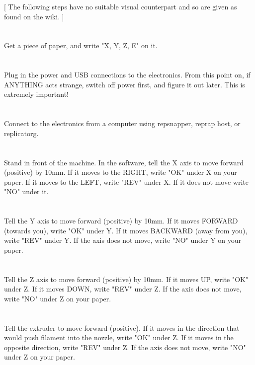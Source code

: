 \documentclass[twoside,openany,a4paper,titlepage]{memoir}
\begin{document}
	[ The following steps have no suitable visual counterpart and so are given as found on the wiki. ]
	
	\section{}
	Get a piece of paper, and write "X, Y, Z, E" on it.
	
	\section{}
	Plug in the power and USB connections to the electronics. From this point on, if ANYTHING acts
	strange, switch off power first, and figure it out later. This is extremely important!
	
	\section{}
	Connect to the electronics from a computer using repsnapper, reprap host, or replicatorg.
	
	\section{}
	Stand in front of the machine. In the software, tell the X axis to move forward (positive) by 10mm. If it
	moves to the RIGHT, write "OK" under X on your paper. If it moves to the LEFT, write "REV" under X. If
	it does not move write "NO" under it.
	
	\section{}
	Tell the Y axis to move forward (positive) by 10mm. If it moves FORWARD (towards you), write "OK"
	under Y. If it moves BACKWARD (away from you), write "REV" under Y. If the axis does not move,
	write "NO" under Y on your paper.
	
	\section{}
	Tell the Z axis to move forward (positive) by 10mm. If it moves UP, write "OK" under Z. If it moves
	DOWN, write "REV" under Z. If the axis does not move, write "NO" under Z on your paper.
	
	\section{}
	Tell the extruder to move forward (positive). If it moves in the direction that would push filament into the 		nozzle, write "OK" under Z. If it moves in the opposite direction, write "REV" under Z. If the axis
	does not move, write "NO" under Z on your paper.
	
\end{document}
